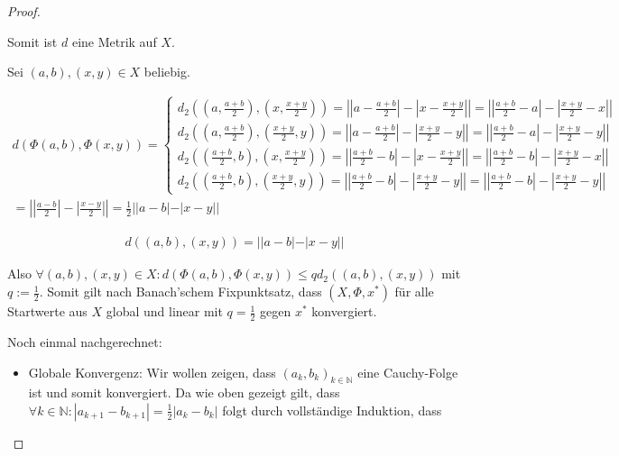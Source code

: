 \documentclass[]{article}
\begin{document}
\begin{proof}
\begin{enumerate}[label=\alph*)]
		Somit ist $d$ eine Metrik auf $X$.
		
		Sei $(a,b), (x,y) \in X$ beliebig.
		
		\begin{align*}
			d(\Phi(a,b), \Phi(x,y))=
			\begin{cases}
				d_2((a, \frac{a+b}{2}), (x,\frac{x+y}{2})) =
				\left|\left|a - \frac{a+b}{2}\right| - \left|x - \frac{x+y}{2}\right|\right| =
				\left|\left|\frac{a+b}{2} - a\right| - \left|\frac{x+y}{2} - x\right|\right| \\
				d_2((a, \frac{a+b}{2}), (\frac{x+y}{2},y))  =
				\left|\left|a - \frac{a+b}{2}\right| - \left|\frac{x+y}{2} - y\right|\right| =
				\left|\left|\frac{a+b}{2} - a\right| - \left|\frac{x+y}{2} - y\right|\right| \\
				d_2((\frac{a+b}{2}, b), (x,\frac{x+y}{2}))  =
				\left|\left|\frac{a+b}{2} - b\right| - \left|x - \frac{x+y}{2}\right|\right| =
				\left|\left|\frac{a+b}{2} - b\right| - \left|\frac{x+y}{2} - x\right|\right| \\
				d_2((\frac{a+b}{2}, b), (\frac{x+y}{2},y))  =
				\left|\left|\frac{a+b}{2} - b\right| - \left|\frac{x+y}{2} - y\right|\right| =
				\left|\left|\frac{a+b}{2} - b\right| - \left|\frac{x+y}{2} - y\right|\right|
			\end{cases}\\
			= \left|\left|\frac{a-b}{2}\right|-\left|\frac{x-y}{2}\right|\right|=\frac{1}{2}||a-b|-|x-y||
		\end{align*}
		
		\begin{align*}
			d((a,b),(x,y)) = ||a-b|-|x-y||
		\end{align*}
		
		Also $\forall (a,b), (x,y) \in X: d(\Phi(a,b), \Phi(x,y)) \le q d_2((a,b),(x,y))$ mit $q:=\frac{1}{2}$. Somit gilt nach Banach'schem Fixpunktsatz, dass $(X, \Phi, x^*)$ für alle Startwerte aus $X$ global und linear mit $q=\frac{1}{2}$ gegen $x^*$ konvergiert.
		
		\vspace{3cm}
		
		Noch einmal nachgerechnet:
		
		\begin{itemize}
			\item Globale Konvergenz: Wir wollen zeigen, dass $(a_k, b_k)_{k \in \mathbb{N}}$ eine Cauchy-Folge ist und somit konvergiert.	
			Da wie oben gezeigt gilt, dass $\forall k \in \mathbb{N}: |a_{k+1} - b_{k+1}| = \frac{1}{2}|a_k - b_k|$ folgt durch vollständige Induktion, dass
			

\end{itemize}
\end{enumerate}
\end{proof}
\end{document}
